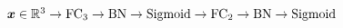 $\vect{x} \in \real^3
	\newline \rightarrow \text{FC}_{3} \rightarrow \text{BN}
	\newline \rightarrow \text{Sigmoid}
	\newline \rightarrow \text{FC}_{2} \rightarrow \text{BN}
	\newline \rightarrow \text{Sigmoid}$
